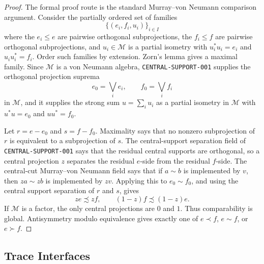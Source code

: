 \documentclass{article}
\newcommand{\cM}{\mathcal M}
\begin{document}
\begin{proof}
The formal proof route is the standard Murray--von Neumann comparison
argument.  Consider the partially ordered set of families
\[
  \{(e_i,f_i,u_i)\}_{i\in I}
\]
where the \(e_i\le e\) are pairwise orthogonal subprojections, the
\(f_i\le f\) are pairwise orthogonal subprojections, and \(u_i\in\cM\) is a
partial isometry with \(u_i^*u_i=e_i\) and \(u_i u_i^*=f_i\).  Order such
families by extension.  Zorn's lemma gives a maximal family.  Since \(\cM\)
is a von Neumann algebra, \texttt{CENTRAL-SUPPORT-001} supplies the
orthogonal projection suprema
\[
  e_0=\bigvee_i e_i,\qquad f_0=\bigvee_i f_i
\]
in \(\cM\), and it supplies the strong sum \(u=\sum_i u_i\) as a partial
isometry in \(\cM\) with \(u^*u=e_0\) and \(uu^*=f_0\).

Let \(r=e-e_0\) and \(s=f-f_0\).  Maximality says that no nonzero
subprojection of \(r\) is equivalent to a subprojection of \(s\).  The
central-support separation field of \texttt{CENTRAL-SUPPORT-001} says that
the residual central supports are orthogonal, so a central projection \(z\)
separates the residual \(e\)-side from the residual \(f\)-side.  The
central-cut Murray--von Neumann field says that if \(a\sim b\) is implemented
by \(v\), then \(za\sim zb\) is implemented by \(zv\).  Applying this to
\(e_0\sim f_0\), and using the central support separation of \(r\) and \(s\),
gives
\[
  ze\precsim zf,\qquad (1-z)f\precsim (1-z)e.
\]
If \(\cM\) is a factor, the only central projections are \(0\) and \(1\).
Thus comparability is global.  Antisymmetry modulo equivalence gives exactly
one of \(e\prec f\), \(e\sim f\), or \(e\succ f\).
\end{proof}

\subsection*{Trace Interfaces}
\end{document}
